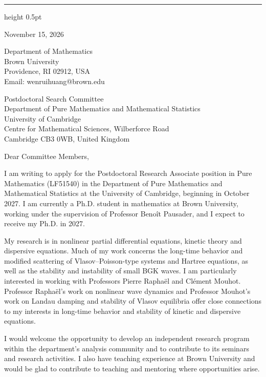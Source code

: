 \documentclass[10pt]{article}
\begin{document}
\vspace{0.08in}
\hrule height 0.5pt

\vspace{0.47in}
\hfill
\begin{minipage}{2.27in}
November 15, 2026

\vspace{0.16in}
Department of Mathematics\\
Brown University\\
Providence, RI 02912, USA\\
Email: wenrui\textunderscore huang@brown.edu
\end{minipage}

\vspace{0.30in}
Postdoctoral Search Committee\\
Department of Pure Mathematics and Mathematical Statistics\\
University of Cambridge\\
Centre for Mathematical Sciences, Wilberforce Road\\
Cambridge CB3 0WB, United Kingdom

\vspace{0.16in}
Dear Committee Members,

I am writing to apply for the Postdoctoral Research Associate position in Pure Mathematics (LF51540) in the Department of Pure Mathematics and Mathematical Statistics at the University of Cambridge, beginning in October 2027. I am currently a Ph.D. student in mathematics at Brown University, working under the supervision of Professor Beno\^{i}t Pausader, and I expect to receive my Ph.D. in 2027.

My research is in nonlinear partial differential equations, kinetic theory and dispersive equations. Much of my work concerns the long-time behavior and modified scattering of Vlasov--Poisson-type systems and Hartree equations, as well as the stability and instability of small BGK waves. I am particularly interested in working with Professors Pierre Rapha\"{e}l and Cl\'{e}ment Mouhot. Professor Rapha\"{e}l's work on nonlinear wave dynamics and Professor Mouhot's work on Landau damping and stability of Vlasov equilibria offer close connections to my interests in long-time behavior and stability of kinetic and dispersive equations.

I would welcome the opportunity to develop an independent research program within the department's analysis community and to contribute to its seminars and research activities. I also have teaching experience at Brown University and would be glad to contribute to teaching and mentoring where opportunities arise.
\end{document}
